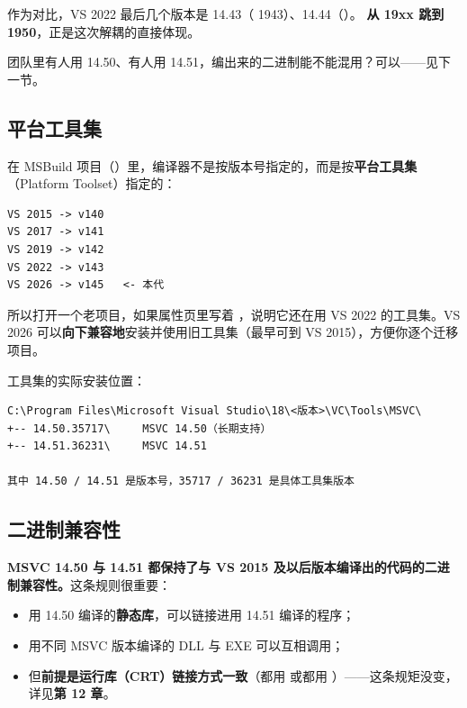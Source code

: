 作为对比，VS 2022 最后几个版本是 14.43（ 1943）、14.44（）。\textbf{ 从 19xx 跳到 1950}，正是这次解耦的直接体现。

\begin{keybox}[实战场景]
团队里有人用 14.50、有人用 14.51，编出来的二进制能不能混用？可以——见下一节。
\end{keybox}

\subsection{平台工具集 }
在 MSBuild 项目（）里，编译器不是按版本号指定的，而是按\textbf{平台工具集}（Platform Toolset）指定的：

\begin{lstlisting}[style=textstyle]
VS 2015 -> v140
VS 2017 -> v141
VS 2019 -> v142
VS 2022 -> v143
VS 2026 -> v145   <- 本代
\end{lstlisting}

所以打开一个老项目，如果属性页里写着 ，说明它还在用 VS 2022 的工具集。VS 2026 可以\textbf{向下兼容地}安装并使用旧工具集（最早可到 VS 2015），方便你逐个迁移项目。

工具集的实际安装位置：

\begin{lstlisting}[style=textstyle]
C:\Program Files\Microsoft Visual Studio\18\<版本>\VC\Tools\MSVC\
+-- 14.50.35717\     MSVC 14.50（长期支持）
+-- 14.51.36231\     MSVC 14.51

其中 14.50 / 14.51 是版本号，35717 / 36231 是具体工具集版本
\end{lstlisting}

\subsection{二进制兼容性}
\textbf{MSVC 14.50 与 14.51 都保持了与 VS 2015 及以后版本编译出的代码的二进制兼容性。}这条规则很重要：

\begin{itemize}
  \item 用 14.50 编译的\textbf{静态库}，可以链接进用 14.51 编译的程序；
  \item 用不同 MSVC 版本编译的 DLL 与 EXE 可以互相调用；
  \item 但\textbf{前提是运行库（CRT）链接方式一致}（都用  或都用 ）——这条规矩没变，详见\textbf{第 12 章}。
\end{itemize}

